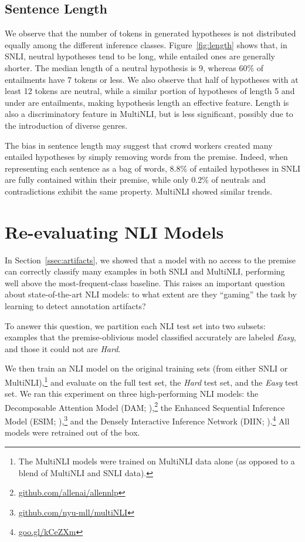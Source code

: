 \subsection{Sentence Length}
\label{ssec:length}

We observe that the number of tokens in generated hypotheses is not distributed equally among the different inference classes. 
Figure~\ref{fig:length} shows that, in SNLI, neutral hypotheses tend to be long, while entailed ones are generally shorter. The median length of a neutral hypothesis is 9, whereas 60\% of entailments have 7 tokens or less. We also observe that half of hypotheses with at least 12 tokens are neutral, while a similar portion of hypotheses of length 5 and under are entailments, making hypothesis length an effective feature. Length is also a discriminatory feature in MultiNLI, but is less significant, possibly due to the introduction of diverse genres.

The bias in sentence length may suggest that crowd workers created many entailed hypotheses by simply removing words from the premise. Indeed, when representing each sentence as a bag of words, 8.8\% of entailed hypotheses in SNLI are fully contained within their premise, while only 0.2\% of neutrals and contradictions exhibit the same property. MultiNLI showed similar trends.

\section{Re-evaluating NLI Models}
\label{ssec:sota}

In Section~\ref{ssec:artifacts}, we showed that a model with no access to the premise can correctly classify many examples in both SNLI and MultiNLI, performing well above the most-frequent-class baseline. This raises an important question about state-of-the-art NLI models: to what extent are they ``gaming'' the task by learning to detect annotation artifacts?

To answer this question, we partition each NLI test set into two subsets: examples that the premise-oblivious model classified accurately are labeled \textit{Easy}, and those it could not are \textit{Hard}. 

We then train an NLI model on the original training sets (from either SNLI or MultiNLI),\footnote{The MultiNLI models were trained on MultiNLI data alone (as opposed to a blend of MultiNLI and SNLI data).} and evaluate on the full test set, the \textit{Hard} test set, and the \textit{Easy} test set. We ran this experiment on three high-performing NLI models: the Decomposable Attention Model (DAM; \citealp{Parikh:2016}),\footnote{
\url{github.com/allenai/allennlp}
} the Enhanced Sequential Inference Model (ESIM;  \citealp{Chen:2017}),\footnote{
\url{github.com/nyu-mll/multiNLI}
} and the Densely Interactive Inference Network (DIIN; \citealp{Gong:2017}).\footnote{

\url{goo.gl/kCeZXm}} 
All models were retrained out of the box.

